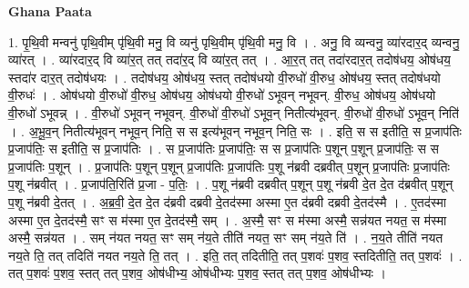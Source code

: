 \documentclass[17pt]{extarticle}
\begin{document}
\textbf{Ghana Paata } \newline

1. पृ॒थि॒वी मन्वनु॑ पृथि॒वीम् पृ॑थि॒वी मनु॒ वि व्यनु॑ पृथि॒वीम् पृ॑थि॒वी मनु॒ वि । . अनु॒ वि व्यन्वनु॒ व्या॑रदार॒द् व्यन्वनु॒ व्या॑रत् । . व्या॑रदार॒द् वि व्या॑र॒त् तत् तदा॑र॒द् वि व्या॑र॒त् तत् । . आ॒र॒त् तत् तदा॑रदार॒त् तदोष॑धय॒ ओष॑धय॒ स्तदा॑र दार॒त् तदोष॑धयः । . तदोष॑धय॒ ओष॑धय॒ स्तत् तदोष॑धयो वी॒रुधो॑ वी॒रुध॒ ओष॑धय॒ स्तत् तदोष॑धयो वी॒रुधः॑ । . ओष॑धयो वी॒रुधो॑ वी॒रुध॒ ओष॑धय॒ ओष॑धयो वी॒रुधो॑ ऽभूवन् नभूवन्. वी॒रुध॒ ओष॑धय॒ ओष॑धयो वी॒रुधो॑ ऽभूवन्न् । . वी॒रुधो॑ ऽभूवन् नभूवन्. वी॒रुधो॑ वी॒रुधो॑ ऽभूव॒न् नितीत्य॑भूवन्. वी॒रुधो॑ वी॒रुधो॑ ऽभूव॒न् निति॑ । . अ॒भू॒व॒न् नितीत्य॑भूवन् नभूव॒न् निति॒ स स इत्य॑भूवन् नभूव॒न् निति॒ सः । . इति॒ स स इतीति॒ स प्र॒जाप॑तिः प्र॒जाप॑तिः॒ स इतीति॒ स प्र॒जाप॑तिः । . स प्र॒जाप॑तिः प्र॒जाप॑तिः॒ स स प्र॒जाप॑तिः प॒शून् प॒शून् प्र॒जाप॑तिः॒ स स प्र॒जाप॑तिः प॒शून् । . प्र॒जाप॑तिः प॒शून् प॒शून् प्र॒जाप॑तिः प्र॒जाप॑तिः प॒शू न॑ब्रवी दब्रवीत् प॒शून् प्र॒जाप॑तिः प्र॒जाप॑तिः प॒शू न॑ब्रवीत् । . प्र॒जाप॑ति॒रिति॑ प्र॒जा - प॒तिः॒ । . प॒शू न॑ब्रवी दब्रवीत् प॒शून् प॒शू न॑ब्रवी दे॒त दे॒त द॑ब्रवीत् प॒शून् प॒शू न॑ब्रवी दे॒तत् । . अ॒ब्र॒वी॒ दे॒त दे॒त द॑ब्रवी दब्रवी दे॒तद॑स्मा अस्मा ए॒त द॑ब्रवी दब्रवी दे॒तद॑स्मै । . ए॒तद॑स्मा अस्मा ए॒त दे॒तद॑स्मै॒ सꣳ स म॑स्मा ए॒त दे॒तद॑स्मै॒ सम् । . अ॒स्मै॒ सꣳ स म॑स्मा अस्मै॒ सन्न॑यत नयत॒ स म॑स्मा अस्मै॒ सन्न॑यत । . सम् न॑यत नयत॒ सꣳ सम् न॑य॒ते तीति॑ नयत॒ सꣳ सम् न॑य॒ते ति॑ । . न॒य॒ते तीति॑ नयत नय॒ते ति॒ तत् तदिति॑ नयत नय॒ते ति॒ तत् । . इति॒ तत् तदितीति॒ तत् प॒शवः॑ प॒शव॒ स्तदितीति॒ तत् प॒शवः॑ । . तत् प॒शवः॑ प॒शव॒ स्तत् तत् प॒शव॒ ओष॑धीभ्य॒ ओष॑धीभ्यः प॒शव॒ स्तत् तत् प॒शव॒ ओष॑धीभ्यः । \newline
\end{document}
